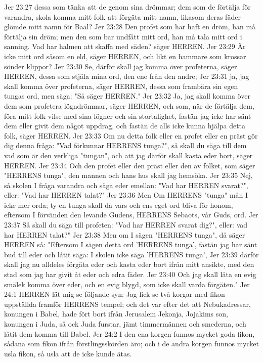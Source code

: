 Jer 23:27  dessa som tänka att de genom sina drömmar; dem som de förtälja för varandra, skola komma mitt folk att förgäta mitt namn, likasom deras fäder glömde mitt namn för Baal?
Jer 23:28  Den profet som har haft en dröm, han må förtälja sin dröm; men den som bar undfått mitt ord, han må tala mitt ord i sanning. Vad har halmen att skaffa med säden? säger HERREN.
Jer 23:29  Är icke mitt ord såsom en eld, säger HERREN, och likt en hammare som krossar sönder klippor?
Jer 23:30  Se, därför skall jag komma över profeterna, säger HERREN, dessa som stjäla mina ord, den ene från den andre;
Jer 23:31  ja, jag skall komma över profeterna, säger HERREN, dessa som frambära sin egen tungas ord, men säga: "Så säger HERREN."
Jer 23:32  Ja, jag skall komma över dem som profetera lögndrömmar, säger HERREN, och som, när de förtälja dem, föra mitt folk vilse med sina lögner och sin stortalighet, fastän jag icke har sänt dem eller givit dem något uppdrag, och fastän de alls icke kunna hjälpa detta folk, säger HERREN.
Jer 23:33  Om nu detta folk eller en profet eller en präst gör dig denna fråga: "Vad förkunnar HERRENS tunga?", så skall du säga till dem vad som är den verkliga "tungan", och att jag därför skall kasta eder bort, säger HERREN.
Jer 23:34  Och den profet eller den präst eller den av folket, som säger "HERRENS tunga", den mannen och hans hus skall jag hemsöka.
Jer 23:35  Nej, så skolen I fråga varandra och säga eder emellan: "Vad har HERREN svarat?", eller: "Vad har HERREN talat?"
Jer 23:36  Men Om HERRENS "tunga" mån I icke mer orda; ty en tunga skall då vars och ens eget ord bliva för honom, eftersom I förvänden den levande Gudens, HERRENS Sebaots, vår Guds, ord.
Jer 23:37  Så skall du säga till profeten: "Vad har HERREN svarat dig?", eller: vad har HERREN talat?"
Jer 23:38  Men om I sägen "HERRENS tunga", då säger HERREN så: "Eftersom I sägen detta ord 'HERRENS tunga', fastän jag har sänt bud till eder och låtit säga: I skolen icke säga 'HERRENS tunga',
Jer 23:39  därför skall jag nu alldeles förgäta eder och kasta eder bort ifrån mitt ansikte, med den stad som jag har givit åt eder och edra fäder.
Jer 23:40  Och jag skall låta en evig smälek komma över eder, och en evig blygd, som icke skall varda förgäten."
Jer 24:1  HERREN lät mig se följande syn: Jag fick se två korgar med fikon uppställda framför HERRENS tempel; och det var efter det att Nebukadressar, konungen i Babel, hade fört bort ifrån Jerusalem Jekonja, Jojakims son, konungen i Juda, så ock Juda furstar, jämt timmermännen och smederna, och låtit dem komma till Babel.
Jer 24:2  I den ena korgen funnos mycket goda fikon, sådana som fikon ifrån förstlingsskörden äro; och i de andra korgen funnos mycket usla fikon, så usla att de icke kunde ätas.
